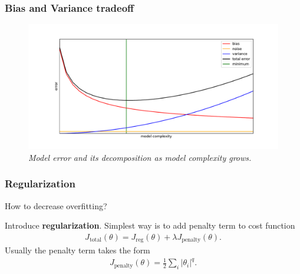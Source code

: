 \documentclass{beamer}
\newcommand{\bi}{\begin{itemize}}
\newcommand{\ei}{\end{itemize}}
\begin{document}
\begin{frame}
\frametitle{Bias and Variance tradeoff}
\begin{figure}
	\centering
	\includegraphics[scale=0.5]{bias_variance.pdf}
	\caption{ \it Model error and its decomposition as model complexity grows.}
\end{figure}
\end{frame}



\begin{frame}
\frametitle{Regularization}
How to decrease overfitting? \pause

Introduce \textbf{regularization}. Simplest way is to add penalty term to cost function
\begin{align}
J_{\text{total}}(\theta) = J_{\text{reg}}(\theta) + \lambda J_{\text{penalty}} (\theta) .
\end{align}
Usually the penalty term takes the form
\begin{align}
J_{\text{penalty}} (\theta) = \frac{1}{2} \sum_i |\theta_i|^q.
\end{align}
\end{frame}
\end{document}
